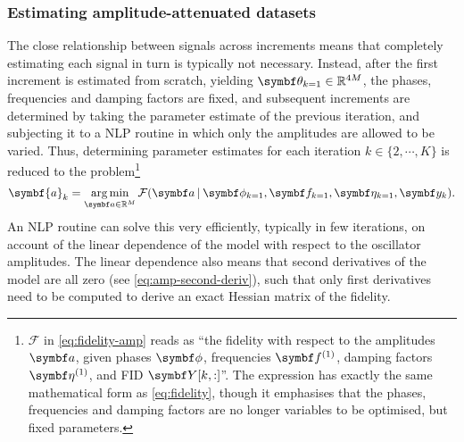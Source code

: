 \subsubsection{Estimating amplitude-attenuated datasets}
The close relationship between signals across increments means that completely
estimating each signal in turn is typically not necessary. Instead, after the
first increment is estimated from scratch, yielding $\bth_{k=1} \in
\mathbb{R}^{4M}$, the phases, frequencies and damping factors are fixed, and
subsequent increments are determined by taking the parameter estimate of the
previous iteration, and subjecting it to a \ac{NLP} routine in which only the
amplitudes are allowed to be varied. Thus, determining parameter estimates for
each iteration $k \in \lbrace2, \cdots, K\rbrace$ is reduced to the
problem\footnote{
    $\mathcal{F}$ in \cref{eq:fidelity-amp} reads as ``the fidelity
    with respect to the amplitudes $\bda$, given phases $\bdphi$,
    frequencies $\bdfone$, damping factors  $\bdetaone$, and \ac{FID}
    $\bY[k,:]$''. The expression has exactly the same mathematical form as
    \cref{eq:fidelity}, though it emphasises that the phases, frequencies and
    damping factors are no longer variables to be optimised, but fixed
    parameters.
}
\begin{equation}
    \symbf{a}_k = \argmin_{\bda \in \mathbb{R}^M}
        \mathcal{F}(\bda \hspace*{2pt} | \hspace*{2pt}
        \bdphi_{k=1}, \bdf_{k=1}, \bdeta_{k=1}, \by_k).
        \label{eq:fidelity-amp}
\end{equation}
An \ac{NLP} routine can solve this very efficiently, typically in few
iterations, on account of the linear dependence of the model with respect to
the oscillator amplitudes. The linear dependence also means that second
derivatives of the model are all zero (see \cref{eq:amp-second-deriv}),
such that only first derivatives need to be computed to derive an exact Hessian
matrix of the fidelity.

